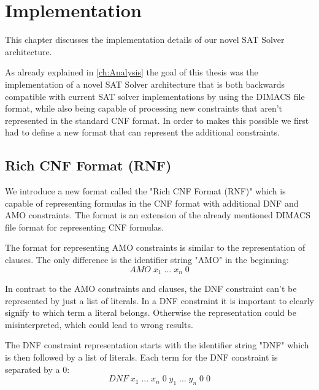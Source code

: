 \chapter{Implementation}
\label{ch:Implementation}

This chapter discusses the implementation details of our novel SAT Solver architecture.

As already explained in \ref{ch:Analysis} the goal of this thesis was the implementation of a novel SAT Solver architecture that is both backwards compatible with current SAT solver implementations by using the DIMACS file format, while also being capable of processing new constraints that aren't represented in the standard CNF format. In order to makes this possible we first had to define a new format that can represent the additional constraints.

\section{Rich CNF Format (RNF)}

We introduce a new format called the "Rich CNF Format (RNF)" which is capable of representing formulas in the CNF format with additional DNF and AMO constraints. The format is an extension of the already mentioned DIMACS file format for representing CNF formulas.

\begin{leftbar}
The format for representing AMO constraints is similar to the representation of clauses. The only difference is the identifier string "AMO" in the beginning:
\begin{displaymath}
AMO \; x_1 \; ... \; x_n \; 0
\end{displaymath}
\end{leftbar}

In contrast to the AMO constraints and clauses, the DNF constraint can't be represented by just a list of literals. In a DNF constraint it is important to clearly signify to which term a literal belongs. Otherwise the representation could be misinterpreted, which could lead to wrong results.

\begin{leftbar}
The DNF constraint representation starts with the identifier string "DNF" which is then followed by a list of literals. Each term for the DNF constraint is separated by a 0:
\begin{displaymath}
DNF \; x_1 \; ... \; x_n \; 0 \; y_1 \; ... \; y_n \; 0 \; 0
\end{displaymath}
\end{leftbar}

